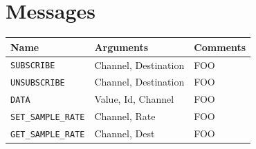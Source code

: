 \documentclass[a4paper]{report}
\begin{document}
\section*{Messages}
\begin{tabular}{ l | l | l }
  \textbf{Name} & \textbf{Arguments} & \textbf{Comments} \\ \hline
  \texttt{SUBSCRIBE} & Channel, Destination & FOO \\
  \texttt{UNSUBSCRIBE} & Channel, Destination & FOO \\
  \texttt{DATA} & Value, Id, Channel & FOO \\
  \texttt{SET\_SAMPLE\_RATE} & Channel, Rate & FOO \\
  \texttt{GET\_SAMPLE\_RATE} & Channel, Dest & FOO \\
\end{tabular}

\end{document}
